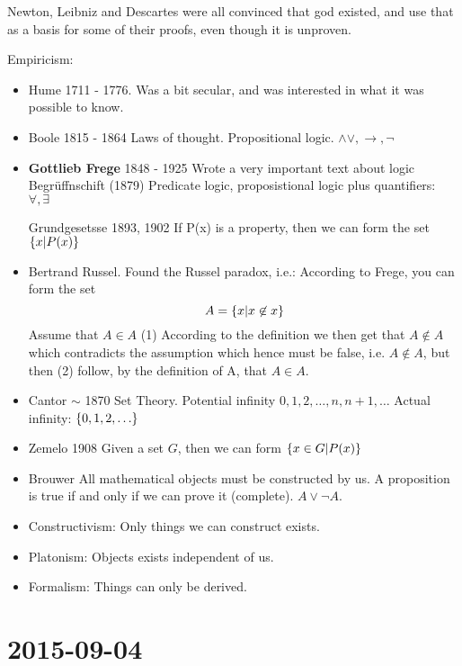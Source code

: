 \documentclass[12pt]{report}
\begin{document}
Newton, Leibniz and Descartes were all convinced that god existed, and use that
as a basis for some of their proofs, even though it is unproven.

Empiricism:
\begin{itemize}
    \item Hume 1711 - 1776. Was a bit secular, and was interested in what it was
      possible to know.
    \item Boole 1815 - 1864 Laws of thought.
      Propositional logic. $\wedge \vee, \rightarrow, \lnot$
    \item \textbf{Gottlieb Frege} 1848 - 1925
      Wrote a very important text about logic Begrüffnschift (1879)
      Predicate logic, proposistional logic plus quantifiers: $\forall,\exists$

      Grundgesetsse 1893, 1902
      If P(x) is a property, then we can form the set $\{ x | P(x)\}$

      \item Bertrand Russel. Found the Russel paradox, i.e.:
        According to Frege, you can form the set 
        \[ A = \{x | x \not\in x \}\]
        Assume that $A \in A$ (1)
         According to the definition we then get that $A \not\in A$ which
          contradicts the assumption which hence must be false, i.e. $A \not\in
          A$, but then (2) follow, by the definition of A, that $A \in A$.
        \item  Cantor $\sim$ 1870 Set Theory.
          Potential infinity $0,1,2, \dotsc, n, n+1, \dotsc$
          Actual infinity:
          $\set{0,1,2, \dotsc}$
        \item Zemelo 1908 Given a set $G$, then we can form $\{x \in G | P(x)\}$
        \item Brouwer
          All mathematical objects must be constructed by us.
          A proposition is true if and only if we can prove it (complete).
          $A \vee \lnot A$.
\end{itemize}

\begin{itemize}
\item Constructivism: Only things we can construct exists.
\item Platonism: Objects exists independent of us.
\item Formalism: Things can only be derived.
\end{itemize}


\chapter{2015-09-04}
\end{document}
